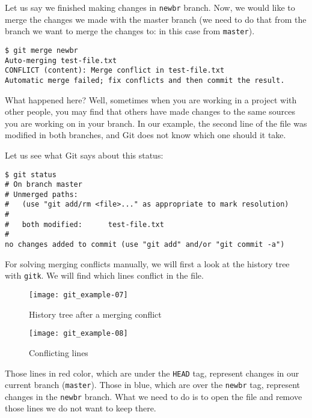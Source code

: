 \documentclass[a4paper,10pt]{article}
\newenvironment{terminal}
  {
    \vspace{+10pt}
    \begin{center}
    \begin{minipage}{0.95\textwidth}
    \begin{framed}
  }
  {
    \end{framed}
    \end{minipage}
    \end{center}
    \vspace{+10pt}
  }
\begin{document}
Let us say we finished making changes in \texttt{newbr} branch. Now, we
would like to merge the changes we made with the master branch (we
need to do that from the branch we want to merge the changes to: in
this case from \texttt{master}).

\begin{terminal}
\begin{verbatim}
$ git merge newbr
Auto-merging test-file.txt
CONFLICT (content): Merge conflict in test-file.txt
Automatic merge failed; fix conflicts and then commit the result.
\end{verbatim}
\end{terminal}

What happened here? Well, sometimes when you are working in a project
with other people, you may find that others have made changes to the
same sources you are working on in your branch. In our example, the
second line of the file was modified in both branches, and Git does not
know which one should it take.

Let us see what Git says about this status:

\begin{terminal}
\begin{verbatim}
$ git status
# On branch master
# Unmerged paths:
#   (use "git add/rm <file>..." as appropriate to mark resolution)
#
#	both modified:      test-file.txt
#
no changes added to commit (use "git add" and/or "git commit -a")
\end{verbatim}
\end{terminal}

For solving merging conflicts manually, we will first a look at the
history tree with \texttt{gitk}. We will find which lines conflict in
the file.

\begin{figure}
  \begin{center}
    \texttt{[image: git\_example-07]}
  \end{center}
  \caption{History tree after a merging conflict}
\end{figure}

\begin{figure}
  \begin{center}
    \texttt{[image: git\_example-08]}
  \end{center}
  \caption{Conflicting lines}
\end{figure}

Those lines in red color, which are under the \texttt{HEAD} tag,
represent changes in our current branch (\texttt{master}). Those in
blue, which are over the \texttt{newbr} tag, represent changes in the
\texttt{newbr} branch. What we need to do is to open the file and
remove those lines we do not want to keep there.
\end{document}
